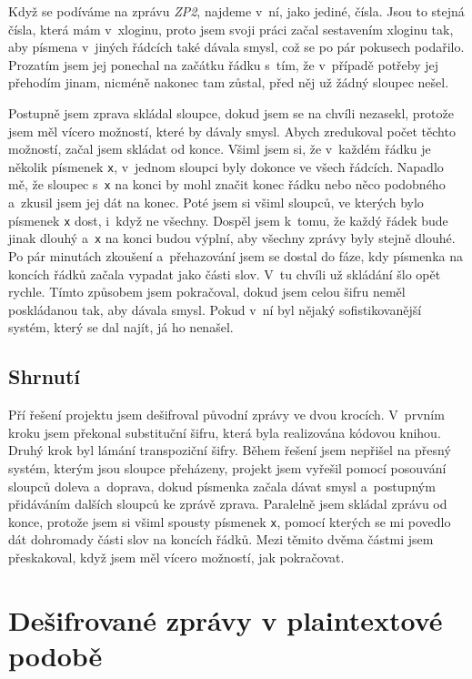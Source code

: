 \documentclass[a4paper, 11pt]{article}
\begin{document}
Když se podíváme na zprávu \emph{ZP2}, najdeme v~ní, jako jediné, čísla.
Jsou to stejná čísla, která mám v~xloginu, proto jsem svoji práci začal sestavením xloginu tak, aby písmena v~jiných řádcích také dávala smysl, což se po pár pokusech podařilo. 
Prozatím jsem jej ponechal na začátku řádku s~tím, že v~případě potřeby jej přehodím jinam, nicméně nakonec tam zůstal, před něj už žádný sloupec nešel.

Postupně jsem zprava skládal sloupce, dokud jsem se na chvíli nezasekl, protože jsem měl vícero možností, které by dávaly smysl.
Abych zredukoval počet těchto možností, začal jsem skládat od konce.
Všiml jsem si, že v~každém řádku je několik písmenek \texttt{x}, v~jednom sloupci byly dokonce ve všech řádcích.
Napadlo mě, že sloupec s~\texttt{x} na konci by mohl značit konec řádku nebo něco podobného a~zkusil jsem jej dát na konec.
Poté jsem si všiml sloupců, ve kterých bylo písmenek \texttt{x} dost, i~když ne všechny.
Dospěl jsem k~tomu, že každý řádek bude jinak dlouhý a~\texttt{x} na konci budou výplní, aby všechny zprávy byly stejně dlouhé.
Po pár minutách zkoušení a~přehazování jsem se dostal do fáze, kdy písmenka na koncích řádků začala vypadat jako části slov.
V~tu chvíli už skládání šlo opět rychle.
Tímto způsobem jsem pokračoval, dokud jsem celou šifru neměl poskládanou tak, aby dávala smysl.
Pokud v~ní byl nějaký sofistikovanější systém, který se dal najít, já ho nenašel.

\subsection{Shrnutí}

Pří řešení projektu jsem dešifroval původní zprávy ve dvou krocích.
V~prvním kroku jsem překonal substituční šifru, která byla realizována kódovou knihou.
Druhý krok byl lámání transpoziční šifry.
Během řešení jsem nepřišel na přesný systém, kterým jsou sloupce přeházeny, projekt jsem vyřešil pomocí posouvání sloupců doleva a~doprava, dokud písmenka začala dávat smysl a~postupným přidáváním dalších sloupců ke zprávě zprava.
Paralelně jsem skládal zprávu od konce, protože jsem si všiml spousty písmenek \texttt{x}, pomocí kterých se mi povedlo dát dohromady části slov na koncích řádků.
Mezi těmito dvěma částmi jsem přeskakoval, když jsem měl vícero možností, jak pokračovat.

\section{Dešifrované zprávy v plaintextové podobě}
\end{document}
